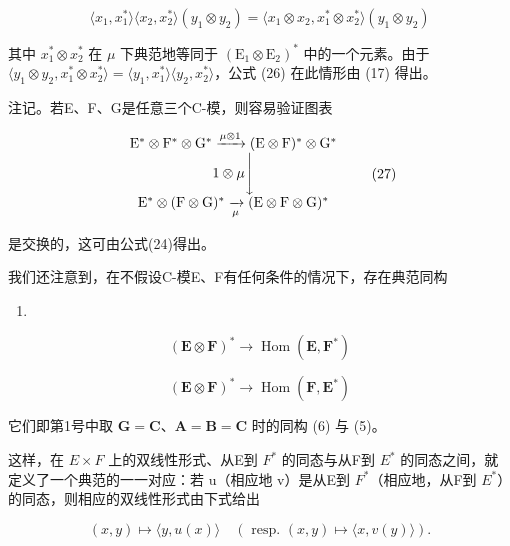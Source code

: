 \[
\langle x _ {1}, x _ {1} ^ {*} \rangle \langle x _ {2}, x _ {2} ^ {*} \rangle (y _ {1} \otimes y _ {2}) = \langle x _ {1} \otimes x _ {2}, x _ {1} ^ {*} \otimes x _ {2} ^ {*} \rangle (y _ {1} \otimes y _ {2})
\]

其中 \(x_{1}^{*}\otimes x_{2}^{*}\) 在 \(\mu\) 下典范地等同于 \((\mathrm{E}_{1}\otimes\mathrm{E}_{2})^{*}\) 中的一个元素。由于 \(\langle y_{1}\otimes y_{2},x_{1}^{*}\otimes x_{2}^{*}\rangle=\langle y_{1},x_{1}^{*}\rangle\langle y_{2},x_{2}^{*}\rangle\)，公式 (26) 在此情形由 (17) 得出。

注记。若E、F、G是任意三个C-模，则容易验证图表

\[
\begin{array}{c} \mathrm{E} ^ {*} \otimes \mathrm{F} ^ {*} \otimes \mathrm{G} ^ {*} \xrightarrow {\mu \otimes 1} (\mathrm{E} \otimes \mathrm{F}) ^ {*} \otimes \mathrm{G} ^ {*} \\ 1 \otimes \mu \Biggl \downarrow \\ \mathrm{E} ^ {*} \otimes (\mathrm{F} \otimes \mathrm{G}) ^ {*} \xrightarrow [ \mu ]{} (\mathrm{E} \otimes \mathrm{F} \otimes \mathrm{G}) ^ {*} \end{array}\tag{27}
\]

是交换的，这可由公式(24)得出。

我们还注意到，在不假设C-模E、F有任何条件的情况下，存在典范同构

\begin{enumerate}
\def\labelenumi{(\arabic{enumi})}
\setcounter{enumi}{27}
\tightlist
\item
\end{enumerate}

\[
(\mathbf {E} \otimes \mathbf {F}) ^ {*} \rightarrow \operatorname{Hom} (\mathbf {E}, \mathbf {F} ^ {*})\tag{29}
\]

\[
(\mathbf {E} \otimes \mathbf {F}) ^ {*} \rightarrow \operatorname{Hom} (\mathbf {F}, \mathbf {E} ^ {*})
\]

它们即第1号中取 \(\mathbf{G} = \mathbf{C}\)、\(\mathbf{A} = \mathbf{B} = \mathbf{C}\) 时的同构 (6) 与 (5)。

这样，在 \(E \times F\) 上的双线性形式、从E到 \(F^{*}\) 的同态与从F到 \(E^{*}\) 的同态之间，就定义了一个典范的一一对应：若 u（相应地 v）是从E到 \(F^{*}\)（相应地，从F到 \(E^{*}\)）的同态，则相应的双线性形式由下式给出

\[
(x, y) \mapsto \langle y, u (x) \rangle \quad (\text { resp. } (x, y) \mapsto \langle x, v (y) \rangle).
\]

